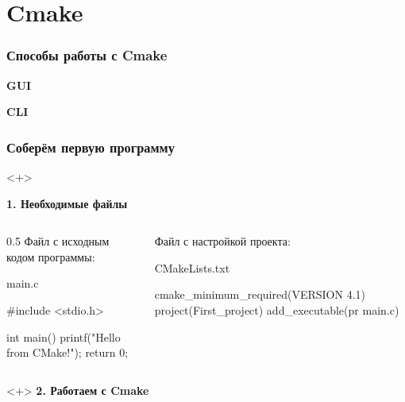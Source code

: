\documentclass[10pt, aspectratio=1610]{beamer}
\begin{document}
\section{Cmake}

\begin{frame}\frametitle{Способы работы с Cmake}
	
	
	{
		\centering
		
		\textbf{GUI}
		
	}
	{
		\centering
		
		\textbf{CLI}
		
	}
	
	

	
\end{frame}


\begin{frame}[fragile, t]\frametitle{Соберём первую программу}
	
	\begin{onlyenv}<+>
		
	\textbf{1. Необходимые файлы }
		
	\vspace{1cm}	

	\begin{columns}[t]
		\edef\colA{0.5}
		\begin{column}{\colA\linewidth}
			Файл с исходным кодом программы:
			\begin{block}{\ttfamily main.c}
			\begin{cppcode}
				#include <stdio.h>
								
				int main()
				{
					printf("Hello from CMake!");				
					return 0;
				}
			\end{cppcode}
			\end{block}
		\end{column}
		\begin{column}{\fpeval{1-\colA}\linewidth}
			Файл с настройкой проекта:
			\begin{block}{\ttfamily CMakeLists.txt}
			\begin{cmakecode}
				cmake_minimum_required(VERSION 4.1)
				project(First_project)
				add_executable(pr main.c)
			\end{cmakecode}
			\end{block}
		\end{column}
	\end{columns}

	\end{onlyenv}
	\begin{onlyenv}<+>
		\textbf{2. Работаем с Cmake}
		


\end{onlyenv}
\end{frame}
\end{document}
